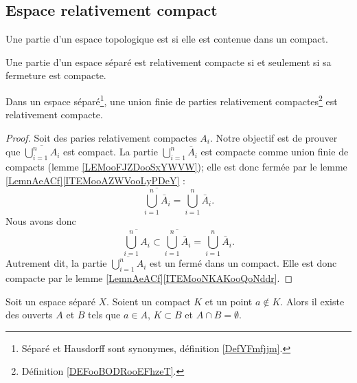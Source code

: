 \subsection{Espace relativement compact}

\begin{definition}      \label{DEFooBODRooEFhzeT}
	Une partie d'un espace topologique est  si elle est contenue dans un compact.
\end{definition}

\begin{proposition}	\label{PROPooXKBXooUIwTiO}
	Une partie d'un espace séparé est relativement compacte si et seulement si sa fermeture est compacte.
\end{proposition}

\begin{lemma}		\label{LEMooJXGUooXDGIXG}
	Dans un espace séparé\footnote{Séparé et Hausdorff sont synonymes, définition \ref{DefYFmfjjm}.}, une union finie de parties relativement compactes\footnote{Définition \ref{DEFooBODRooEFhzeT}.} est relativement compacte.
\end{lemma}

\begin{proof}
	Soit des paries relativement compactes \( A_i\). Notre objectif est de prouver que \( \overline{\bigcup_{i=1}^nA_i}\) est compact. La partie \( \bigcup_{i=1}^n\bar A_i\) est compacte comme union finie de compacts (lemme \ref{LEMooFJZDooSxYWVW}); elle est donc fermée par le lemme \ref{LemnAeACf}\ref{ITEMooAZWVooLyPDeY} :
	\begin{equation}
		\overline{\bigcup_{i=1}^n\bar A_i}=\bigcup_{i=1}^n\bar A_i.
	\end{equation}
	Nous avons donc
	\begin{equation}
		\overline{\bigcup_{i=1}^nA_i}\subset\overline{\bigcup_{i=1}^n\bar A_i}=\bigcup_{i=1}^n\bar A_i.
	\end{equation}
	Autrement dit, la partie \( \overline{\bigcup_{i=1}^nA_i}\) est un fermé dans un compact. Elle est donc compacte par le lemme \ref{LemnAeACf}\ref{ITEMooNKAKooQoNddr}.
\end{proof}

\begin{lemma}			\label{LEMooNIJEooMdvkuA}
	Soit un espace séparé \( X\). Soient un compact \( K\) et un point \( a\not\in K\). Alors il existe des ouverts \( A\) et \( B\) tels que \( a\in A\), \( K\subset B\) et \( A\cap B=\emptyset\).
\end{lemma}

